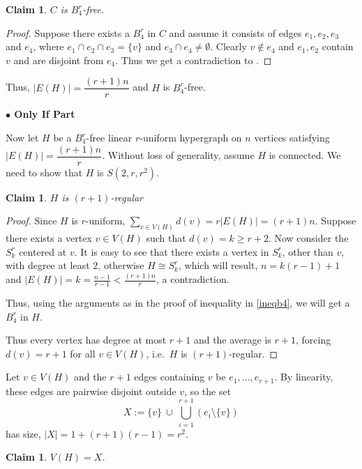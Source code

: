 \documentclass[11pt,a4paper]{article}
\newtheorem{claim}[theorem]{Claim}
\theoremstyle{definition}
\theoremstyle{remark}
\begin{document}
\begin{claim}
    $C$ is $B_4^r$-free.
\end{claim}
\begin{proof}
    Suppose there exists a $B_4^r$ in $C$ and assume it consists of edges $e_1,e_2,e_3$ and $e_4$, where $e_1\cap e_2\cap e_3 = \{v\}$ and $e_3\cap e_4 \neq \emptyset$. Clearly $v \notin e_4$ and $e_1,e_2$ contain $v$ and are disjoint from $e_4$. Thus we get a contradiction to .
\end{proof}
Thus, $|E(H)| = \dfrac{(r+1)n}{r}$ and $H$ is $B_4^r$-free. 


\noindent\textbf{$\bullet$ Only If Part}

\noindent Now let $H$ be a $B_4^r$-free linear $r$-uniform hypergraph on $n$ vertices satisfying $|E(H)|=\dfrac{(r+1)n}{r}$. Without loss of generality, assume $H$ is connected. We need to show that $H$ is $S(2,r,r^2)$.
\begin{claim}
    $H$ is $(r+1)$-regular
\end{claim}
\begin{proof}
    Since $H$ is $r$-uniform, $\sum_{v\in V(H)} d(v) = r|E(H)| = (r+1)n$. Suppose there exists a vertex $v \in V(H)$ such that $d(v) = k \geq r+2$. Now consider the $S_k^r$ centered at $v$. It is easy to see that there exists a vertex in $S_k^r$, other than $v$, with degree at least $2$, otherwise $H \cong S_k^r$, which will result, $n = k(r-1) +1$ and $|E(H)| = k = \frac{n-1}{r-1} < \frac{(r+1)n}{r}$, a contradiction.
    
    Thus, using the arguments as in the proof of inequality in \cref{ineqb4}, we will get a $B_4^r$ in $H$.

    Thus every vertex has degree at most $r+1$ and the average is $r+1$, forcing
$d(v)=r+1$ for all $v\in V(H)$, i.e.\ $H$ is $(r+1)$-regular.
\end{proof}

Let $v \in V(H)$ and the $r+1$ edges containing $v$ be $e_1,\dots,e_{r+1}$.
By linearity, these edges are pairwise disjoint outside $v$, so the set
$$
X:=\{v\}\ \cup\ \bigcup_{i=1}^{r+1}(e_i\setminus\{v\})
$$
has size, $|X| = 1 + (r+1)(r-1) = r^2$.

\begin{claim}
$V(H)=X$.
\end{claim}
\end{document}
